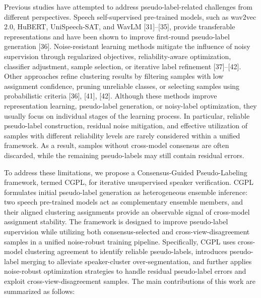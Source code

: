 \documentclass[journal]{IEEEtran}
\begin{document}
Previous studies have attempted to address pseudo-label-related
challenges from different perspectives. Speech self-supervised
pre-trained models, such as wav2vec 2.0, HuBERT, UniSpeech-SAT, and
WavLM [31]--[35], provide transferable representations and have been
shown to improve first-round pseudo-label generation [36].
Noise-resistant learning methods mitigate the influence of noisy
supervision through regularized objectives, reliability-aware
optimization, classifier adjustment, sample selection, or iterative
label refinement [37]--[42]. Other approaches refine clustering results
by filtering samples with low assignment confidence, pruning unreliable classes, or
selecting samples using probabilistic criteria [36], [41], [42].
Although these methods improve representation learning, pseudo-label
generation, or noisy-label optimization, they usually focus on
individual stages of the learning process. In particular, reliable
pseudo-label construction, residual noise mitigation, and effective
utilization of samples with different reliability levels are rarely
considered within a unified framework. As a result, samples without cross-model consensus
are often discarded, while the remaining pseudo-labels may still
contain residual errors.

To address these limitations, we propose a Consensus-Guided
Pseudo-Labeling framework, termed CGPL, for iterative unsupervised
speaker verification. CGPL formulates initial pseudo-label generation as
heterogeneous ensemble inference: two speech pre-trained models act as
complementary ensemble members, and their aligned clustering assignments
provide an observable signal of cross-model assignment stability. The framework is designed to improve
pseudo-label supervision while utilizing both
consensus-selected and cross-view-disagreement samples in a unified
noise-robust training pipeline. Specifically, CGPL uses cross-model
clustering agreement to identify reliable pseudo-labels, introduces
pseudo-label merging to alleviate speaker-cluster over-segmentation,
and further applies noise-robust optimization strategies to handle
residual pseudo-label errors and exploit cross-view-disagreement samples. The main
contributions of this work are summarized as follows:
\end{document}
